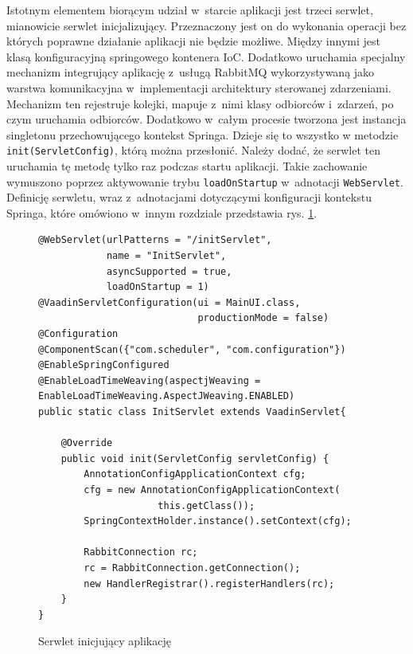 \documentclass[a4paper]{book}
\begin{document}
{Istotnym elementem biorącym udział w~starcie aplikacji jest trzeci serwlet, mianowicie serwlet inicjalizujący. Przeznaczony jest on do wykonania operacji bez których poprawne działanie aplikacji nie będzie możliwe. Między innymi jest klasą konfiguracyjną springowego kontenera IoC. Dodatkowo uruchamia specjalny mechanizm integrujący aplikację z~usługą RabbitMQ wykorzystywaną jako warstwa komunikacyjna w~implementacji architektury sterowanej zdarzeniami. Mechanizm ten rejestruje kolejki, mapuje z~nimi klasy odbiorców i~zdarzeń, po czym uruchamia odbiorców. Dodatkowo w~całym procesie tworzona jest instancja singletonu przechowującego kontekst Springa. Dzieje się to wszystko w metodzie \lstinline|init(ServletConfig)|, którą można przesłonić. Należy dodać, że serwlet ten uruchamia tę metodę tylko raz podczas startu aplikacji. Takie zachowanie wymuszono poprzez aktywowanie trybu \lstinline|loadOnStartup| w~adnotacji \lstinline|WebServlet|. Definicję serwletu, wraz z~adnotacjami dotyczącymi konfiguracji kontekstu Springa, które omówiono w~innym rozdziale przedstawia rys. \ref{id:fig:listing:InitServlet}.
\begin{figure}
\begin{lstlisting}
@WebServlet(urlPatterns = "/initServlet",
            name = "InitServlet", 
            asyncSupported = true, 
            loadOnStartup = 1)
@VaadinServletConfiguration(ui = MainUI.class,
                            productionMode = false)
@Configuration
@ComponentScan({"com.scheduler", "com.configuration"})
@EnableSpringConfigured
@EnableLoadTimeWeaving(aspectjWeaving = EnableLoadTimeWeaving.AspectJWeaving.ENABLED)
public static class InitServlet extends VaadinServlet{

	@Override
	public void init(ServletConfig servletConfig) {
		AnnotationConfigApplicationContext cfg;
		cfg = new AnnotationConfigApplicationContext(
		             this.getClass());
		SpringContextHolder.instance().setContext(cfg);
		
		RabbitConnection rc;
		rc = RabbitConnection.getConnection();
		new HandlerRegistrar().registerHandlers(rc);
	}
}
\end{lstlisting}
\caption{Serwlet inicjujący aplikację}
\label{id:fig:listing:InitServlet}
\end{figure}

}
\end{document}
